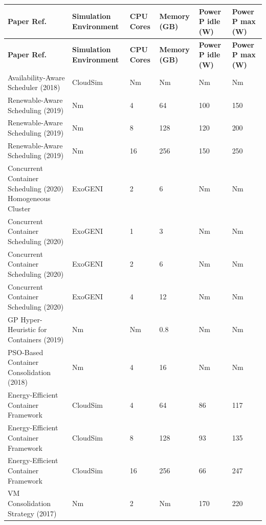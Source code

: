 \documentclass[runningheads]{llncs}
\begin{document}
\begin{footnotesize}
\begin{longtable}{|p{3.8cm}|p{2.2cm}|p{1.2cm}|p{1.5cm}|p{1.8cm}|p{1.8cm}|}
\hline
\textbf{Paper Ref.} & \textbf{Simulation Environment} & \textbf{CPU Cores} & \textbf{Memory (GB)} & \textbf{Power P idle (W)} & \textbf{Power P max (W)} \\
\hline
\endfirsthead

\hline
\textbf{Paper Ref.} & \textbf{Simulation Environment} & \textbf{CPU Cores} & \textbf{Memory (GB)} & \textbf{Power P idle (W)} & \textbf{Power P max (W)} \\
\hline
\endhead
Availability-Aware Scheduler \cite{alahmad_availability-aware_2018} (2018) & CloudSim & Nm & Nm & Nm & Nm \\
\hline
Renewable-Aware Scheduling \cite{kumar_renewable_2019} (2019) & Nm & 4 & 64 & 100 & 150 \\
\hline
Renewable-Aware Scheduling \cite{kumar_renewable_2019} (2019) & Nm & 8 & 128 & 120 & 200 \\
\hline
Renewable-Aware Scheduling \cite{kumar_renewable_2019} (2019) & Nm & 16 & 256 & 150 & 250 \\
\hline
Concurrent Container Scheduling \cite{hu_concurrent_2020} (2020) Homogeneous Cluster & ExoGENI & 2 & 6 & Nm & Nm \\
\hline
Concurrent Container Scheduling \cite{hu_concurrent_2020} (2020) & ExoGENI & 1 & 3 & Nm & Nm \\
\hline
Concurrent Container Scheduling \cite{hu_concurrent_2020} (2020) & ExoGENI & 2 & 6 & Nm & Nm \\
\hline
Concurrent Container Scheduling \cite{hu_concurrent_2020} (2020) & ExoGENI & 4 & 12 & Nm & Nm \\
\hline
GP Hyper-Heuristic for Containers \cite{tan_hybrid_2019} (2019) & Nm & Nm & 0.8 & Nm & Nm \\
\hline
PSO-Based Container Consolidation \cite{shi_energy-aware_2018} (2018) & Nm & 4 & 16 & Nm & Nm \\
\hline
Energy-Efficient Container Framework \cite{piraghaj_framework_2015} & CloudSim & 4 & 64 & 86 & 117 \\
\hline
Energy-Efficient Container Framework \cite{piraghaj_framework_2015} & CloudSim & 8 & 128 & 93 & 135 \\
\hline
Energy-Efficient Container Framework \cite{piraghaj_framework_2015} & CloudSim & 16 & 256 & 66 & 247 \\
\hline
VM Consolidation Strategy \cite{carrega_energy-aware_2017} (2017) & Nm & 2 & Nm & 170 & 220 \\

\end{longtable}
\end{footnotesize}
\end{document}
